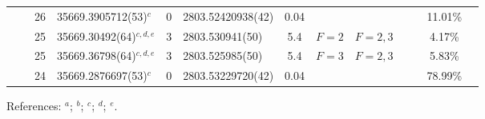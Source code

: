 \begin{table*}
\begin{center}
{\begin{tabular}{:l;l;c;l;c;l;c;l;l;c;c;c;c}
\rowstyle{\itshape}               &        & 26        & 35669.3905712(53)$^{c}$          & 0 & 2803.52420938(42)  & 0.04 & $                                        $ & $                                        $ & $      $ &              & 11.01\%   & $          $\\
\rowstyle{\itshape}               &        & 25        & 35669.30492(64)$^{c,d,e}$        & 3 &   2803.530941(50)  &  5.4 & $F=2                                     $ & $F=2,3                                   $ & $      $ &              & 4.17\%    & $          $\\
\rowstyle{\itshape}               &        & 25        & 35669.36798(64)$^{c,d,e}$        & 3 &   2803.525985(50)  &  5.4 & $F=3                                     $ & $F=2,3                                   $ & $      $ &              & 5.83\%    & $          $\\
\rowstyle{\itshape}               &        & 24        & 35669.2876697(53)$^{c}$          & 0 & 2803.53229720(42)  & 0.04 & $                                        $ & $                                        $ & $      $ &              & 78.99\%   & $          $\\
\hline
\end{tabular}
}
{\footnotesize References:
$^{a}$\citet{Hannemann:2006:012505};
$^{b}$\citet{Salumbides:2006:L41};
$^{c}$\citet{Batteiger:2009:022503};
$^{d}$\citet{Itano:1981:1364};
$^{e}$\citet{Sur:2005:25}.}
\end{center}
\end{table*}
